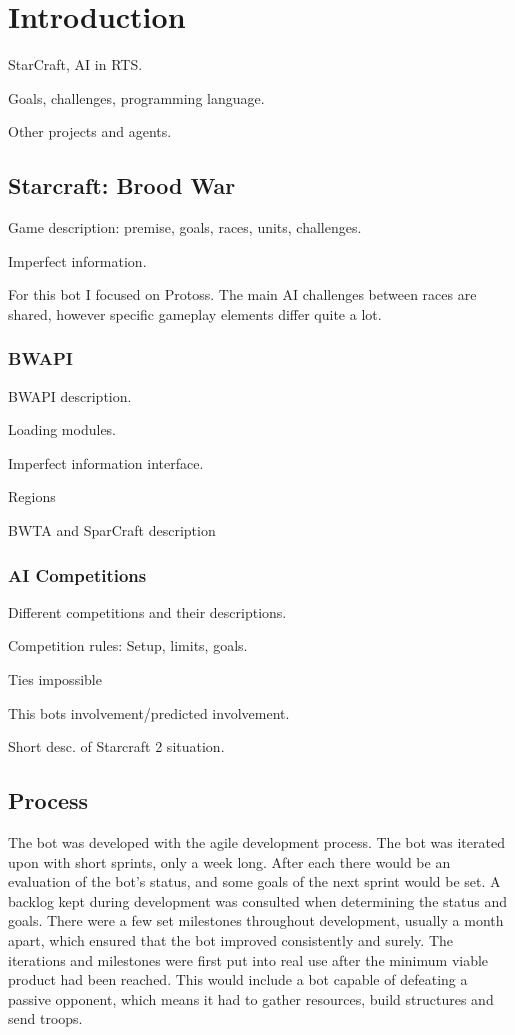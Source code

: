 \chapter{Introduction}
StarCraft, AI in RTS.

Goals, challenges, programming language.

Other projects and agents.

\section{Starcraft: Brood War}
Game description: premise, goals, races, units, challenges.

Imperfect information.

For this bot I focused on Protoss. The main AI challenges between races are shared, however specific gameplay elements differ quite a lot.

\subsection*{BWAPI}
BWAPI description.

Loading modules.

Imperfect information interface.

Regions

BWTA and SparCraft description

\subsection*{AI Competitions}
Different competitions and their descriptions.

Competition rules: Setup, limits, goals.

Ties impossible

This bots involvement/predicted involvement.

Short desc. of Starcraft 2 situation.

\section{Process}
The bot was developed with the agile development process. The bot was iterated upon with short sprints, only a week long. After each there would be an evaluation of the bot's status, and some goals of the next sprint would be set. A backlog kept during development was consulted when determining the status and goals. There were a few set milestones throughout development, usually a month apart, which ensured that the bot improved consistently and surely. The iterations and milestones were first put into real use after the minimum viable product had been reached. This would include a bot capable of defeating a passive opponent, which means it had to gather resources, build structures and send troops.

